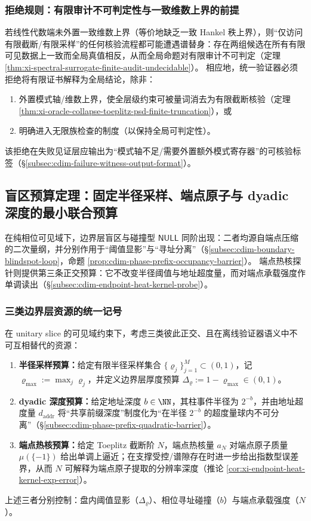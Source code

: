\subsubsection{拒绝规则：有限审计不可判定性与一致维数上界的前提}\label{subsec:cdim-quantifier-elimination-spectral-surrogate}
若线性代数端未外置一致维数上界（等价地缺乏一致 Hankel 秩上界），则“仅访问有限截断/有限采样”的任何核验流程都可能遭遇谱替身：存在两组候选在所有有限可见数据上一致而全局真值相反，从而全局命题对有限审计不可判定（定理 \ref{thm:xi-spectral-surrogate-finite-audit-undecidable}）。
相应地，统一验证器必须拒绝将有限证书解释为全局结论，除非：
\begin{enumerate}
  \item 外置模式轴/维数上界，使全层级约束可被量词消去为有限截断核验（定理 \ref{thm:xi-oracle-collapse-toeplitz-psd-finite-truncation}），或
  \item 明确进入无限族检查的制度（以保持全局可判定性）。
\end{enumerate}
该拒绝在失败见证层应输出为“模式轴不足/需要外置额外模式寄存器”的可核验标签（\S\ref{subsec:cdim-failure-witness-output-format}）。

\subsection{盲区预算定理：固定半径采样、端点原子与 dyadic 深度的最小联合预算}\label{subsec:cdim-blindspot-budget-theorem}
在纯相位可见域下，边界层盲区与碰撞型 \(\mathsf{NULL}\) 同阶出现：二者均源自端点压缩的二次量纲，并分别作用于“阈值显影”与“寻址分离”（\S\ref{subsec:cdim-boundary-blindspot-loop}，命题 \ref{prop:cdim-phase-prefix-occupancy-barrier}）。
端点热核探针则提供第三条正交预算：它不改变半径阈值与地址超度量，而对端点承载强度作单调读出（\S\ref{subsec:cdim-endpoint-heat-kernel-probe}）。

\subsubsection{三类边界层资源的统一记号}\label{subsubsec:cdim-blindspot-budget-notation}
在 unitary slice 的可见域约束下，考虑三类彼此正交、且在离线验证器语义中不可互相替代的资源：
\begin{enumerate}
  \item \textbf{半径采样预算：}给定有限半径采样集合 \(\{\varrho_j\}_{j=1}^{M}\subset(0,1)\)，记 \(\varrho_{\max}:=\max_j\varrho_j\)，并定义边界层厚度预算 \(\Delta_{\varrho}:=1-\varrho_{\max}\in(0,1)\)。
  \item \textbf{dyadic 深度预算：}给定地址深度 \(b\in\NN\)，其柱事件半径为 \(2^{-b}\)，并由地址超度量 \(d_{\mathrm{addr}}\) 将“共享前缀深度”制度化为“在半径 \(2^{-b}\) 的超度量球内不可分离”（\S\ref{subsec:cdim-phase-prefix-quadratic-barrier}）。
  \item \textbf{端点热核预算：}给定 Toeplitz 截断阶 \(N\)，端点热核量 \(a_N\) 对端点原子质量 \(\mu(\{-1\})\) 给出单调上逼近；在支撑受控/谱隙存在时进一步给出指数型误差界，从而 \(N\) 可解释为端点原子提取的分辨率深度（推论 \ref{cor:xi-endpoint-heat-kernel-exp-error}）。
\end{enumerate}
上述三者分别控制：盘内阈值显影（\(\Delta_{\varrho}\)）、相位寻址碰撞（\(b\)）与端点承载强度（\(N\)）。

